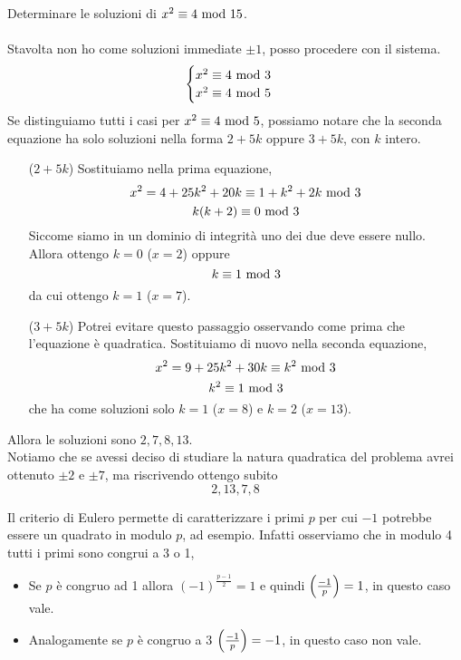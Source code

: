 \begin{esercizio}
	Determinare le soluzioni di $x^2\equiv4\ \mathrm{mod}\ 15$. \\ \\ 
	Stavolta non ho come soluzioni immediate $\pm1$, posso procedere con il sistema.
	\begin{equation*}
	\begin{cases}
	x^2\equiv4\ \mathrm{mod}\ 3\\
	x^2\equiv4\ \mathrm{mod}\ 5
	\end{cases}
	\end{equation*}
	Se distinguiamo tutti i casi per $x^2\equiv4\ \mathrm{mod}\ 5$, possiamo notare che la seconda equazione ha solo soluzioni nella forma $2+5k$ oppure $3+5k$, con $k$ intero. 
	\begin{itemize}
		\item[($2+5k$)] Sostituiamo nella prima equazione, 
		\begin{equation*}
		x^2=4+25k^2+20k\equiv1+k^2+2k\ \mathrm{mod}\ 3
		\end{equation*}
		\begin{equation*}
		k(k+2)\equiv0\ \mathrm{mod}\ 3
		\end{equation*}
		Siccome siamo in un dominio di integrità uno dei due deve essere nullo. Allora ottengo $k=0$ ($x=2$) oppure 
		\begin{equation*}
		k\equiv1\ \mathrm{mod}\ 3
		\end{equation*}
		da cui ottengo $k=1$ ($x=7$).
		\item[($3+5k$)] Potrei evitare questo passaggio osservando come prima che l'equazione è quadratica. Sostituiamo di nuovo nella seconda equazione, 
		\begin{equation*}
		x^2=9+25k^2+30k\equiv k^2\ \mathrm{mod}\ 3
		\end{equation*}
		\begin{equation*}
		k^2\equiv1\ \mathrm{mod}\ 3
		\end{equation*}
		che ha come soluzioni solo $k=1$ ($x=8$) e $k=2$ ($x=13$).
	\end{itemize}
	Allora le soluzioni sono $2,7,8,13$. \\ Notiamo che se avessi deciso di studiare la natura quadratica del problema avrei ottenuto $\pm2$ e $\pm7$, ma riscrivendo ottengo subito
	\begin{equation*}
	2,13,7,8
	\end{equation*}
\end{esercizio}
\begin{osservazione}
	Il criterio di Eulero permette di caratterizzare i primi $p$ per cui $-1$ potrebbe essere un quadrato in modulo $p$, ad esempio. Infatti osserviamo che in modulo 4 tutti i primi sono congrui a 3 o 1,
	\begin{itemize}
		\item Se $p$ è congruo ad 1 allora $(-1)^{\frac{p-1}{2}}=1$ e quindi $\left(\frac{-1}{p}\right)=1$, in questo caso vale.
		\item Analogamente se $p$ è congruo a 3 $\left(\frac{-1}{p}\right)=-1$, in questo caso non vale.
	\end{itemize}
\end{osservazione}




